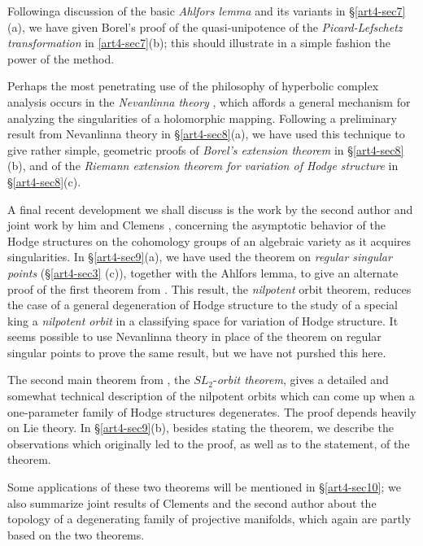 Following\pageoriginale a discussion of the basic \textit{Ahlfors lemma} and its variants in \S \ref{art4-sec7}(a), we have given Borel's proof of the quasi-unipotence of the \textit{Picard-Lefschetz transformation} in \ref{art4-sec7}(b); this should illustrate in a simple fashion the power of the method.

Perhaps the most penetrating use of the philosophy of hyperbolic complex analysis occurs in the \textit{Nevanlinna theory} \cite{art4-key24}, which affords a general mechanism for analyzing the singularities of a holomorphic mapping. Following a preliminary result from Nevanlinna theory in \S \ref{art4-sec8}(a), we have used this technique to give rather simple, geometric proofs of \textit{Borel's extension theorem} \cite{art4-key5} in \S \ref{art4-sec8}(b), and of the \textit{Riemann extension theorem for variation of Hodge structure} \cite{art4-key19} in \S \ref{art4-sec8}(c).

A final recent development we shall discuss is the work by the second author \cite{art4-key41} and joint work by him and Clemens \cite{art4-key10}, concerning the asymptotic behavior of the Hodge structures on the cohomology groups of an algebraic variety as it acquires singularities. In \S \ref{art4-sec9}(a), we have used the theorem on \textit{regular singular points} (\S \ref{art4-sec3} (c)), together with the Ahlfors lemma, to give an alternate proof of the first theorem from \cite{art4-key41}. This result, the \textit{nilpotent} orbit theorem, reduces the case of a general degeneration of Hodge structure to the study of a special king a \textit{nilpotent orbit} in a classifying space for variation of Hodge structure. It seems possible to use Nevanlinna theory in place of the theorem on regular singular points to prove the same result, but we have not purshed this here.

The second main theorem from \cite{art4-key41}, the $SL_2$-\textit{orbit theorem}, gives a detailed and somewhat technical description of the nilpotent orbits which can come up when a one-parameter family of Hodge structures degenerates. The proof depends heavily on Lie theory. In \S \ref{art4-sec9}(b), besides stating the theorem, we describe the observations which originally led to the proof, as well as to the statement, of the theorem.

Some applications of these two theorems will be mentioned in \S\ref{art4-sec10}; we also summarize joint results of Clements and the second author about the topology of a degenerating family of projective manifolds, which again are partly based on the two theorems.


